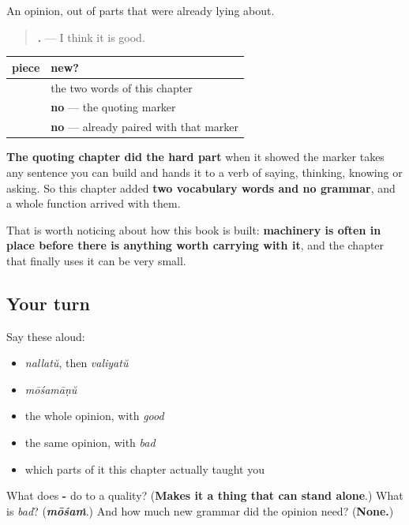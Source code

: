 \begin{grammarlens}[title={What you've built}]
An opinion, out of parts that were already lying about.

\begin{quote}
\textbf{    .} — I think it is good.
\end{quote}

\noindent
\begin{tabularx}{\linewidth}{@{}>{\raggedright\arraybackslash}X>{\raggedright\arraybackslash}X@{}}
\toprule
\textbf{piece} & \textbf{new?} \\
\midrule
\textbf{\ml{അത്} \ml{നല്ലതാണ്}} & the two words of this chapter \\
\textbf{\ml{എന്ന്}} & \textbf{no} — the quoting marker \\
\textbf{\ml{ഞാൻ} \ml{ചിന്തിക്കുന്നു}} & \textbf{no} — already paired with that marker \\
\bottomrule
\end{tabularx}

\textbf{The quoting chapter did the hard part} when it showed the marker takes any sentence you can build and hands it to a verb of saying, thinking, knowing or asking. So this chapter added \textbf{two vocabulary words and no grammar}, and a whole function arrived with them.

That is worth noticing about how this book is built: \textbf{machinery is often in place before there is anything worth carrying with it}, and the chapter that finally uses it can be very small.
\end{grammarlens}

\subsection*{Your turn}
Say these aloud:

\begin{itemize}
\raggedright
  \item \emph{nallatŭ}, then \emph{valiyatŭ}
  \item \emph{mōśamāṇŭ}
  \item the whole opinion, with \emph{good}
  \item the same opinion, with \emph{bad}
  \item which parts of it this chapter actually taught you
\end{itemize}

\begin{tcolorbox}[breakable,colback=teal!4,colframe=teal!35!black,title={Before you move on}]
What does \textbf{-} do to a quality? (\textbf{Makes it a thing that can stand alone}.) What is \emph{bad}? (\emph{\textbf{mōśaṁ}}.) And how much new grammar did the opinion need? (\textbf{None.})
\end{tcolorbox}
